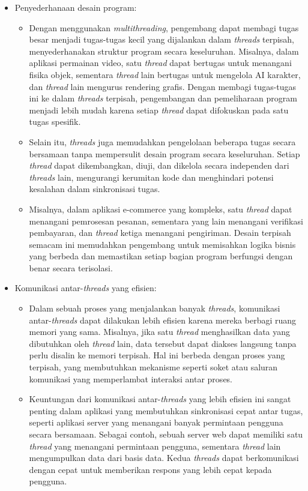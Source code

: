 \documentclass[12pt]{article}
\begin{document}
\begin{itemize}
    \item Penyederhanaan desain program:
    \begin{itemize}
        \item Dengan menggunakan \textit{multithreading}, pengembang dapat membagi tugas besar menjadi tugas-tugas kecil yang dijalankan dalam \textit{threads} terpisah, menyederhanakan struktur program secara keseluruhan. Misalnya, dalam aplikasi permainan video, satu \textit{thread} dapat bertugas untuk menangani fisika objek, sementara \textit{thread} lain bertugas untuk mengelola AI karakter, dan \textit{thread} lain mengurus rendering grafis. Dengan membagi tugas-tugas ini ke dalam \textit{threads} terpisah, pengembangan dan pemeliharaan program menjadi lebih mudah karena setiap \textit{thread} dapat difokuskan pada satu tugas spesifik.
        \item Selain itu, \textit{threads} juga memudahkan pengelolaan beberapa tugas secara bersamaan tanpa mempersulit desain program secara keseluruhan. Setiap \textit{thread} dapat dikembangkan, diuji, dan dikelola secara independen dari \textit{threads} lain, mengurangi kerumitan kode dan menghindari potensi kesalahan dalam sinkronisasi tugas.
        \item Misalnya, dalam aplikasi e-commerce yang kompleks, satu \textit{thread} dapat menangani pemrosesan pesanan, sementara yang lain menangani verifikasi pembayaran, dan \textit{thread} ketiga menangani pengiriman. Desain terpisah semacam ini memudahkan pengembang untuk memisahkan logika bisnis yang berbeda dan memastikan setiap bagian program berfungsi dengan benar secara terisolasi.
    \end{itemize}
    
    \item Komunikasi antar-\textit{threads} yang efisien:
    \begin{itemize}
        \item Dalam sebuah proses yang menjalankan banyak \textit{threads}, komunikasi antar-\textit{threads} dapat dilakukan lebih efisien karena mereka berbagi ruang memori yang sama. Misalnya, jika satu \textit{thread} menghasilkan data yang dibutuhkan oleh \textit{thread} lain, data tersebut dapat diakses langsung tanpa perlu disalin ke memori terpisah. Hal ini berbeda dengan proses yang terpisah, yang membutuhkan mekanisme seperti soket atau saluran komunikasi yang memperlambat interaksi antar proses.
        \item Keuntungan dari komunikasi antar-\textit{threads} yang lebih efisien ini sangat penting dalam aplikasi yang membutuhkan sinkronisasi cepat antar tugas, seperti aplikasi server yang menangani banyak permintaan pengguna secara bersamaan. Sebagai contoh, sebuah server web dapat memiliki satu \textit{thread} yang menangani permintaan pengguna, sementara \textit{thread} lain mengumpulkan data dari basis data. Kedua \textit{threads} dapat berkomunikasi dengan cepat untuk memberikan respons yang lebih cepat kepada pengguna.
    \end{itemize}
    

\end{itemize}
\end{document}
